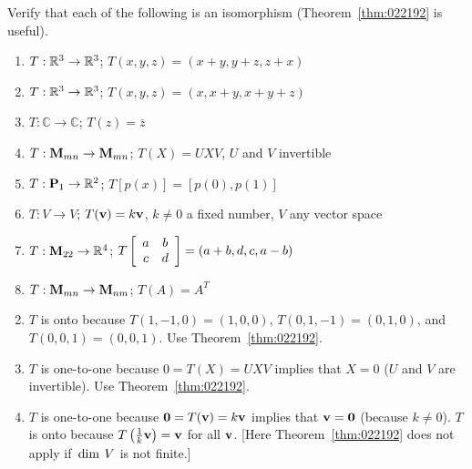 \begin{multicols}{2}
\begin{ex}
Verify that each of the following is an isomorphism (Theorem~\ref{thm:022192} is useful).


\begin{enumerate}[label={\alph*.}]
\item $T : \mathbb{R}^3 \to \mathbb{R}^3$; $T(x, y, z) = (x + y, y + z, z + x)$

\item $T : \mathbb{R}^3 \to \mathbb{R}^3$; $T(x, y, z) = (x, x + y, x + y + z)$

\item $T : \mathbb{C} \to \mathbb{C}$; $T(z) = \overline{z}$

\item $T : \textbf{M}_{mn} \to \textbf{M}_{mn}$; $T(X) = UXV$, $U$ and $V$ invertible

\item $T : \textbf{P}_{1} \to \mathbb{R}^2$; $T\left[p(x)\right] = \left[p(0), p(1)\right]$

\item $T : V \to V$; $T(\textbf{v}) = k\textbf{v}$, $k \neq 0$ a fixed number, $V$ any vector space

\item $T : \textbf{M}_{22} \to \mathbb{R}^4$; $T\left[ \begin{array}{cc}
a & b \\
c & d
\end{array} \right] = (a + b, d, c, a - b)$

\item $T : \textbf{M}_{mn} \to \textbf{M}_{nm}$; $T(A) = A^{T}$

\end{enumerate}
\begin{sol}
\begin{enumerate}[label={\alph*.}]
\setcounter{enumi}{1}
\item $T$ is onto because $T(1, -1, 0) = (1, 0, 0)$, $T(0, 1, -1) = (0, 1, 0)$, and $T(0, 0, 1) = (0, 0, 1)$. Use Theorem~\ref{thm:022192}.

\setcounter{enumi}{3}
\item $T$ is one-to-one because $0 = T(X) = UXV$ implies that $X = 0$ ($U$ and $V$ are invertible). Use Theorem~\ref{thm:022192}.

\setcounter{enumi}{5}
\item $T$ is one-to-one because $\textbf{0} = T(\textbf{v}) = k\textbf{v}$ implies that $\textbf{v} = \textbf{0}$ (because $k \neq 0$). $T$ is onto because $T\left(\tfrac{1}{k}\textbf{v}\right) = \textbf{v}$ for all $\textbf{v}$. [Here Theorem~\ref{thm:022192} does not apply if $\thinspace\operatorname{dim \medspace}V$ is not finite.]


\end{enumerate}
\end{sol}
\end{ex}
\end{multicols}
